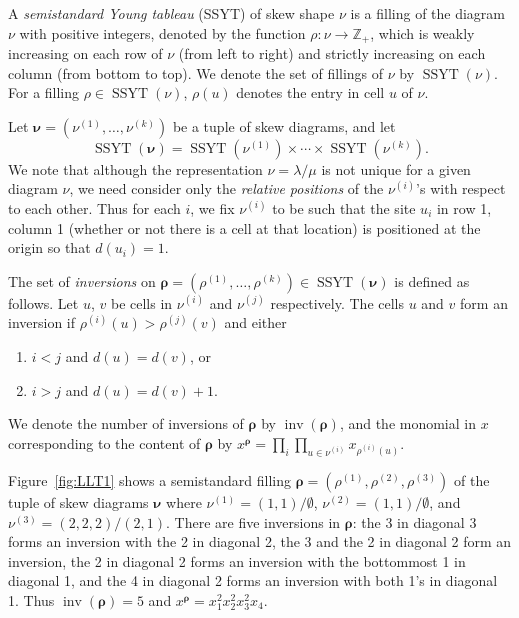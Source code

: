 \documentclass[ALCO,Unicode]{cedram}
\DeclareMathOperator{\inv}{inv}
\DeclareMathOperator{\SSYT}{SSYT}
\begin{document}
A \emph{semistandard Young tableau} (SSYT) of skew shape $\nu$ is a filling of the diagram $\nu$ with positive integers, denoted by the function $\rho:\nu \rightarrow \mathbb{Z}_+$, which is weakly increasing on each row of $\nu$ (from left to right) and strictly increasing on each column (from bottom to top). We denote the set of fillings of $\nu$ by $\SSYT(\nu)$. For a filling $\rho\in\SSYT(\nu)$, $\rho(u)$ denotes the entry in cell $u$ of $\nu$.

Let $\boldsymbol{\nu}=(\nu^{(1)},\ldots,\nu^{(k)})$ be a tuple of skew diagrams, and let 
\[
\SSYT(\boldsymbol{\nu})=\SSYT(\nu^{(1)})\times\cdots\times\SSYT(\nu^{(k)}).
\] 
We note that although the representation $\nu=\lambda/\mu$ is not unique for a given diagram $\nu$, we need consider only the \emph{relative positions} of the $\nu^{(i)}$'s with respect to each other. Thus for each $i$, we fix $\nu^{(i)}$ to be such that the site $u_i$ in row 1, column 1 (whether or not there is a cell at that location) is positioned at the origin so that $d(u_i)=1$. 

\begin{defn}\label{def:LLTinversions}
The set of \emph{inversions} on $\boldsymbol{\rho}=(\rho^{(1)},\ldots,\rho^{(k)})\in\SSYT(\boldsymbol{\nu})$ is defined as follows. Let $u$, $v$ be cells in $\nu^{(i)}$ and $\nu^{(j)}$ respectively.
The cells $u$ and $v$ form an inversion if $\rho^{(i)}(u)>\rho^{(j)}(v)$ and either
\begin{enumerate}[label=\roman*.]
\item $i<j$ and $d(u)=d(v)$, or
\item $i>j$ and $d(u)=d(v)+1$.
\end{enumerate}
\end{defn}

We denote the number of inversions of $\boldsymbol{\rho}$ by $\inv(\boldsymbol{\rho})$, and 
the monomial in $x$ corresponding to the content of $\boldsymbol{\rho}$ by
$x^{\boldsymbol{\rho}} = \prod_i \prod_{u\in \nu^{(i)}} x_{\rho^{(i)}(u)}$. 

\begin{example}
Figure~\ref{fig:LLT1} shows a semistandard filling $\boldsymbol{\rho}=(\rho^{(1)},\rho^{(2)},\rho^{(3)})$ of the tuple of skew diagrams $\boldsymbol{\nu}$ where $\nu^{(1)}=(1,1)/\emptyset$, $\nu^{(2)}=(1,1)/\emptyset$, and $\nu^{(3)}=(2,2,2)/(2,1)$. There are five inversions in $\boldsymbol{\rho}$: the 3 in diagonal 3 forms an inversion with the 2 in diagonal 2, the 3 and the 2 in diagonal 2 form an inversion, the 2 in diagonal 2 forms an inversion with the bottommost 1 in diagonal 1, and the 4 in diagonal 2 forms an inversion with both 1's in diagonal 1. Thus $\inv(\boldsymbol{\rho})=5$ and $x^{\boldsymbol{\rho}}=x_1^2x_2^2x_3^2x_4$.
\end{example}
\end{document}
